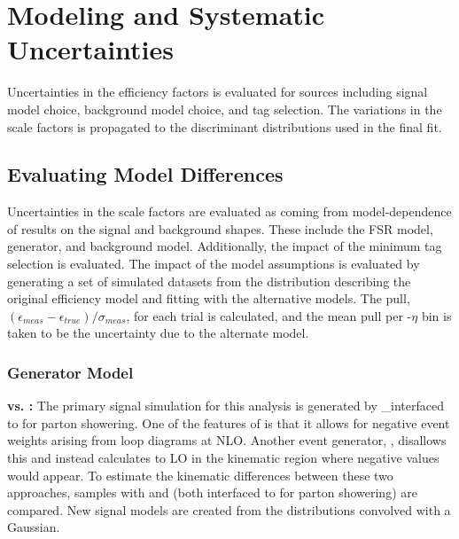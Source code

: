 \section{Modeling and Systematic Uncertainties}\label{ch:eff:systematics}
Uncertainties in the efficiency factors is evaluated for sources including signal model choice, background model choice, and tag selection. The variations in the scale factors is propagated to the discriminant distributions used in the final fit.
\subsection{Evaluating Model Differences}
Uncertainties in the scale factors are evaluated as coming from model-dependence of results on the signal and background shapes. These include the FSR model, generator, and background model. Additionally, the impact of the minimum tag selection \pt is evaluated. 
The impact of the model assumptions is evaluated by generating a set of simulated datasets from the \mll distribution describing the original efficiency model and fitting with the alternative models. The pull, $ (\epsilon_{meas}-\epsilon_{true})/{\sigma_{meas}} $, for each trial is calculated, and the mean pull per \pt-$\eta$ bin is taken to be the uncertainty due to the alternate model. 

\subsubsection{Generator Model}

\textbf{\aMCATNLO vs. \POWHEG:} The primary signal simulation for this analysis is generated by  \_\aMCATNLO interfaced to  for parton showering. One of the features of \aMCATNLO is that it allows for negative event weights arising from loop diagrams at NLO. Another event generator, \POWHEG, disallows this and instead calculates to LO in the kinematic region where negative values would appear. To estimate the kinematic differences between these two approaches, samples with \aMCATNLO and  (both interfaced to  for parton showering) are compared. New signal models are created from the \POWHEG \mll distributions convolved with a Gaussian.

